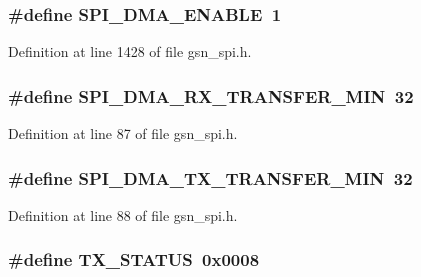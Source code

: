 \hypertarget{a00587_a82dc6617ad4a3ec4336c9739f8657e1c}{
\subsubsection[{SPI\_\-DMA\_\-ENABLE}]{\setlength{\rightskip}{0pt plus 5cm}\#define SPI\_\-DMA\_\-ENABLE~1}}
\label{a00587_a82dc6617ad4a3ec4336c9739f8657e1c}


Definition at line 1428 of file gsn\_\-spi.h.

\hypertarget{a00587_ab6ee6c121b3e29bdf8de48aa17a6d296}{
\subsubsection[{SPI\_\-DMA\_\-RX\_\-TRANSFER\_\-MIN}]{\setlength{\rightskip}{0pt plus 5cm}\#define SPI\_\-DMA\_\-RX\_\-TRANSFER\_\-MIN~32}}
\label{a00587_ab6ee6c121b3e29bdf8de48aa17a6d296}


Definition at line 87 of file gsn\_\-spi.h.

\hypertarget{a00587_af333ca2812c6cbcfd6637a20fa69088b}{
\subsubsection[{SPI\_\-DMA\_\-TX\_\-TRANSFER\_\-MIN}]{\setlength{\rightskip}{0pt plus 5cm}\#define SPI\_\-DMA\_\-TX\_\-TRANSFER\_\-MIN~32}}
\label{a00587_af333ca2812c6cbcfd6637a20fa69088b}


Definition at line 88 of file gsn\_\-spi.h.

\hypertarget{a00587_a7575bf922b1b02fa694d964bb94e1a29}{
\subsubsection[{TX\_\-STATUS}]{\setlength{\rightskip}{0pt plus 5cm}\#define TX\_\-STATUS~0x0008}}
\label{a00587_a7575bf922b1b02fa694d964bb94e1a29}



